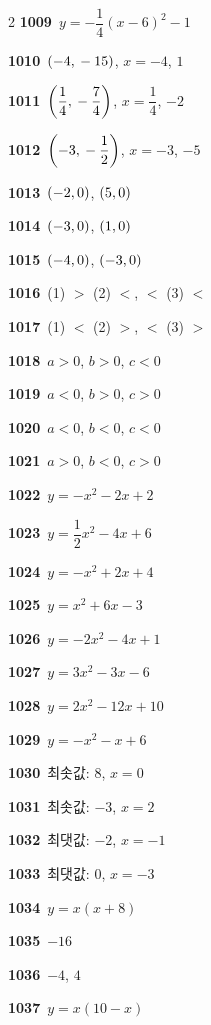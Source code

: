 \documentclass[10pt,a4paper]{article}
\begin{document}
\begin{multicols}{2}
\noindent\textbf{1009}\ $y=-\dfrac{1}{4}(x-6)^2-1$\par
\noindent\textbf{1010}\ $(-4{,}\mkern3mu -15)$, $x=-4$, $1$\par
\noindent\textbf{1011}\ $\left(\dfrac{1}{4}{,}\mkern3mu -\dfrac{7}{4}\right)$, $x=\dfrac{1}{4}$, $-2$\par
\noindent\textbf{1012}\ $\left(-3{,}\mkern3mu -\dfrac{1}{2}\right)$, $x=-3$, $-5$\par
\noindent\textbf{1013}\ $(-2{,}\mkern3mu 0)$, $(5{,}\mkern3mu 0)$\par
\noindent\textbf{1014}\ $(-3{,}\mkern3mu 0)$, $(1{,}\mkern3mu 0)$\par
\noindent\textbf{1015}\ $(-4{,}\mkern3mu 0)$, $(-3{,}\mkern3mu 0)$\par
\noindent\textbf{1016}\ (1) $>$ (2) $<$, $<$ (3) $<$\par
\noindent\textbf{1017}\ (1) $<$ (2) $>$, $<$ (3) $>$\par
\noindent\textbf{1018}\ $a>0$, $b>0$, $c<0$\par
\noindent\textbf{1019}\ $a<0$, $b>0$, $c>0$\par
\noindent\textbf{1020}\ $a<0$, $b<0$, $c<0$\par
\noindent\textbf{1021}\ $a>0$, $b<0$, $c>0$\par
\noindent\textbf{1022}\ $y=-x^2-2x+2$\par
\noindent\textbf{1023}\ $y=\dfrac{1}{2}x^2-4x+6$\par
\noindent\textbf{1024}\ $y=-x^2+2x+4$\par
\noindent\textbf{1025}\ $y=x^2+6x-3$\par
\noindent\textbf{1026}\ $y=-2x^2-4x+1$\par
\noindent\textbf{1027}\ $y=3x^2-3x-6$\par
\noindent\textbf{1028}\ $y=2x^2-12x+10$\par
\noindent\textbf{1029}\ $y=-x^2-x+6$\par
\noindent\textbf{1030}\ 최솟값: $8$, $x=0$\par
\noindent\textbf{1031}\ 최솟값: $-3$, $x=2$\par
\noindent\textbf{1032}\ 최댓값: $-2$, $x=-1$\par
\noindent\textbf{1033}\ 최댓값: $0$, $x=-3$\par
\noindent\textbf{1034}\ $y=x(x+8)$\par
\noindent\textbf{1035}\ $-16$\par
\noindent\textbf{1036}\ $-4$, $4$\par
\noindent\textbf{1037}\ $y=x(10-x)$\par

\end{multicols}
\end{document}
